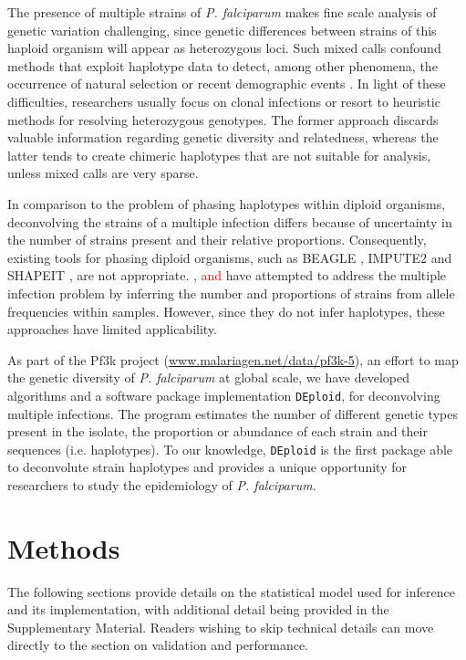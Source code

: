\documentclass{bioinfo}
\newcounter{todocounter}
\newcommand{\done}[2][]
{\todo[color=green!40, #1]{#2}}
\newcommand{\donenum}[2][]
{\stepcounter{todocounter}\done[#1]{\thetodocounter: #2}}
\begin{document}
The presence of multiple strains of {\it P. falciparum} makes fine scale analysis of genetic variation challenging, since genetic differences between strains of this haploid organism will appear as heterozygous loci. Such mixed calls confound methods that exploit haplotype data to detect, among other phenomena, the occurrence of natural selection or recent demographic events \citep{Harris2013, Lawson2012, Mathieson2014, Sabeti2002}. In light of these difficulties, researchers usually focus on clonal infections or resort to heuristic methods for resolving heterozygous genotypes. The former approach discards valuable information regarding genetic diversity and relatedness, whereas the latter tends to create chimeric haplotypes that are not suitable for analysis, unless mixed calls are very sparse.

In comparison to the problem of phasing haplotypes within diploid organisms, deconvolving the strains of a multiple infection differs because of uncertainty in the number of strains present and their relative proportions.  Consequently, existing tools for phasing diploid organisms, such as BEAGLE \citep{Browning2007}, IMPUTE2 \citep{Howie2009} and SHAPEIT \citep{Delaneau2012, Oconnell2014}, are not appropriate. \citet{Galinsky2015}, \citet{Jack2016} \donenum{REV1.20: O'Brien (2016)} \textcolor{red}{and} \citet{Chang2017} have attempted to address the multiple infection problem by inferring the number and proportions of strains from allele frequencies within samples.  However, since they do not infer haplotypes, these approaches have limited applicability.

As part of the Pf3k project (\url{www.malariagen.net/data/pf3k-5}), an effort to map the genetic diversity of {\it P. falciparum} at global scale, we have developed algorithms and a software package implementation \texttt{DEploid}, for deconvolving multiple infections. The program estimates the number of different genetic types present in the isolate, the proportion or abundance of each strain and their sequences (i.e. haplotypes). To our knowledge, \texttt{DEploid} is the first package able to deconvolute strain haplotypes and provides a unique opportunity for researchers to study the epidemiology of {\it P. falciparum}.


\section{Methods}

The following sections provide details on the statistical model used for inference and its implementation, with additional detail being provided in the Supplementary Material.  Readers wishing to skip technical details can move directly to the section on validation and performance.
\end{document}
